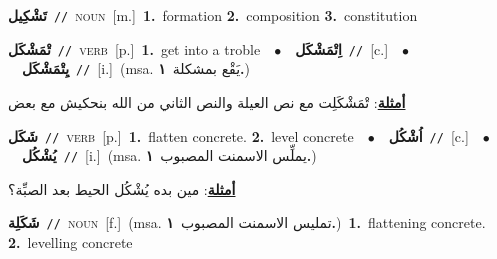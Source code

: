 \documentclass[10pt,a4paper,twoside]{article} %
\begin{document}
\begin{multicols}{2}
{\setlength\topsep{0pt}\textbf{\foreignlanguage{arabic}{تَشْكِيل}}\ {\color{gray}\texttt{//}\color{black}}\ \textsc{noun}\ [m.]\ \textbf{1.}~formation  \textbf{2.}~composition  \textbf{3.}~constitution\ } \vspace{2mm}

{\setlength\topsep{0pt}\textbf{\foreignlanguage{arabic}{تْمَشْكَل}}\ {\color{gray}\texttt{//}\color{black}}\ \textsc{verb}\ [p.]\ \textbf{1.}~get into a troble\ \ $\bullet$\ \ \setlength\topsep{0pt}\textbf{\foreignlanguage{arabic}{اِتْمَشْكَل}}\ {\color{gray}\texttt{//}\color{black}}\ [c.]\ \ $\bullet$\ \ \setlength\topsep{0pt}\textbf{\foreignlanguage{arabic}{يِتْمَشْكَل}}\ {\color{gray}\texttt{//}\color{black}}\ [i.]\ \color{gray}(msa. \foreignlanguage{arabic}{يَقْع بمشكلة}~\foreignlanguage{arabic}{\textbf{١.}})\color{black}\  \begin{flushright}\color{gray}\foreignlanguage{arabic}{\textbf{\underline{\foreignlanguage{arabic}{أمثلة}}}: تْمَشْكَلِت مع نص العيلة والنص الثاني من الله بنحكيش مع بعض}\end{flushright}\color{black}} \vspace{2mm}

{\setlength\topsep{0pt}\textbf{\foreignlanguage{arabic}{شَكَل}}\ {\color{gray}\texttt{//}\color{black}}\ \textsc{verb}\ [p.]\ \textbf{1.}~flatten concrete.  \textbf{2.}~level concrete\ \ $\bullet$\ \ \setlength\topsep{0pt}\textbf{\foreignlanguage{arabic}{اُشْكُل}}\ {\color{gray}\texttt{//}\color{black}}\ [c.]\ \ $\bullet$\ \ \setlength\topsep{0pt}\textbf{\foreignlanguage{arabic}{يُشْكُل}}\ {\color{gray}\texttt{//}\color{black}}\ [i.]\ \color{gray}(msa. \foreignlanguage{arabic}{يملِّس الاسمنت المصبوب}~\foreignlanguage{arabic}{\textbf{١.}})\color{black}\  \begin{flushright}\color{gray}\foreignlanguage{arabic}{\textbf{\underline{\foreignlanguage{arabic}{أمثلة}}}: مين بده يُشْكُل الحيط بعد الصبِّة؟}\end{flushright}\color{black}} \vspace{2mm}

{\setlength\topsep{0pt}\textbf{\foreignlanguage{arabic}{شَكَلِة}}\ {\color{gray}\texttt{//}\color{black}}\ \textsc{noun}\ [f.]\ \color{gray}(msa. \foreignlanguage{arabic}{تمليس الاسمنت المصبوب}~\foreignlanguage{arabic}{\textbf{١.}})\color{black}\ \textbf{1.}~flattening concrete.  \textbf{2.}~levelling concrete\ } \vspace{2mm}


\end{multicols}
\end{document}
